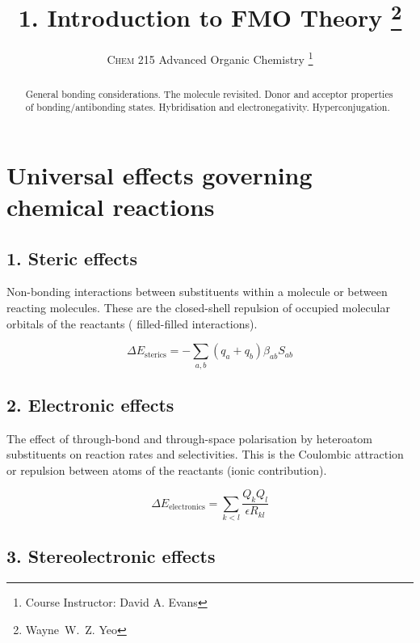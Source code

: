 \documentclass[a4paper]{tufte-handout}
\title{1. Introduction to FMO Theory \thanks{Wayne~W.~Z. Yeo}}
\author[MIT 5.60]{\textsc{Chem 215} Advanced Organic Chemistry \thanks{Course Instructor: David A. Evans}}
\begin{document}
\maketitle %

\begin{abstract}
\noindent
General bonding considerations. The  molecule revisited. Donor and acceptor properties of bonding/antibonding states. Hybridisation and electronegativity. Hyperconjugation.
\end{abstract}


\section*{Universal effects governing chemical reactions}

\subsection*{1. Steric effects}

Non-bonding interactions between substituents within a molecule or between reacting molecules. These
are the closed-shell repulsion of occupied molecular orbitals of the reactants ( filled-filled interactions).

\begin{equation}
  \Delta E_{\textrm{sterics}} = - \sum_{a,b} (q_a + q_b) \beta_{ab} S_{ab}
\end{equation}

\subsection*{2. Electronic effects}

The effect of through-bond and through-space polarisation by heteroatom substituents on reaction rates and selectivities.
This is the Coulombic attraction or repulsion between atoms of the reactants (ionic contribution).

\begin{equation}
  \Delta E_{\textrm{electronics}} = \sum_{k < l} \frac{Q_k Q_l}{\epsilon R_{kl}}
\end{equation}

\subsection*{3. Stereolectronic effects}
\end{document}
